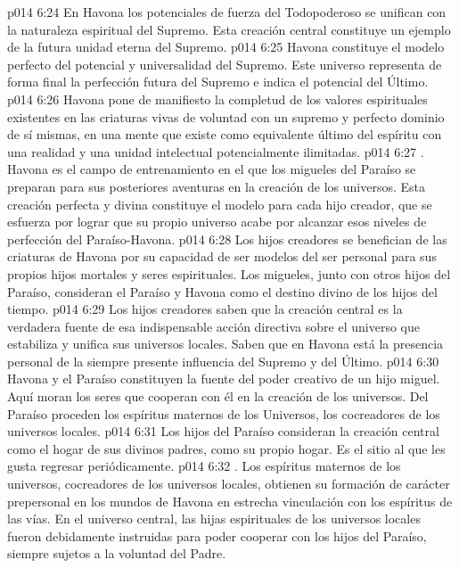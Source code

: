 \vs p014 6:24 En Havona los potenciales de fuerza del Todopoderoso se unifican con la naturaleza espiritual del Supremo. Esta creación central constituye un ejemplo de la futura unidad eterna del Supremo.
\vs p014 6:25 Havona constituye el modelo perfecto del potencial y universalidad del Supremo. Este universo representa de forma final la perfección futura del Supremo e indica el potencial del Último.
\vs p014 6:26 Havona pone de manifiesto la completud de los valores espirituales existentes en las criaturas vivas de voluntad con un supremo y perfecto dominio de sí mismas, en una mente que existe como equivalente último del espíritu con una realidad y una unidad intelectual potencialmente ilimitadas.
\vs p014 6:27 . Havona es el campo de entrenamiento en el que los migueles del Paraíso se preparan para sus posteriores aventuras en la creación de los universos. Esta creación perfecta y divina constituye el modelo para cada hijo creador, que se esfuerza por lograr que su propio universo acabe por alcanzar esos niveles de perfección del Paraíso\hyp{}Havona.
\vs p014 6:28 Los hijos creadores se benefician de las criaturas de Havona por su capacidad de ser modelos del ser personal para sus propios hijos mortales y seres espirituales. Los migueles, junto con otros hijos del Paraíso, consideran el Paraíso y Havona como el destino divino de los hijos del tiempo.
\vs p014 6:29 Los hijos creadores saben que la creación central es la verdadera fuente de esa indispensable acción directiva sobre el universo que estabiliza y unifica sus universos locales. Saben que en Havona está la presencia personal de la siempre presente influencia del Supremo y del Último.
\vs p014 6:30 Havona y el Paraíso constituyen la fuente del poder creativo de un hijo miguel. Aquí moran los seres que cooperan con él en la creación de los universos. Del Paraíso proceden los espíritus maternos de los Universos, los cocreadores de los universos locales.
\vs p014 6:31 Los hijos del Paraíso consideran la creación central como el hogar de sus divinos padres, como su propio hogar. Es el sitio al que les gusta regresar periódicamente.
\vs p014 6:32 . Los espíritus maternos de los universos, cocreadores de los universos locales, obtienen su formación de carácter prepersonal en los mundos de Havona en estrecha vinculación con los espíritus de las vías. En el universo central, las hijas espirituales de los universos locales fueron debidamente instruidas para poder cooperar con los hijos del Paraíso, siempre sujetos a la voluntad del Padre.
